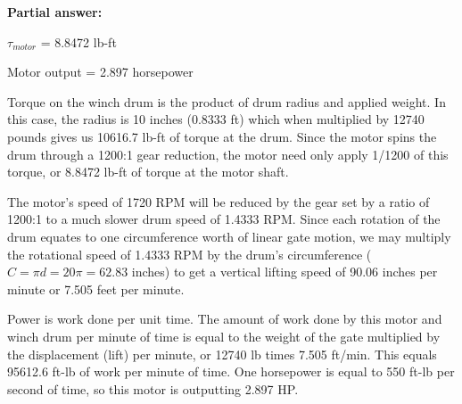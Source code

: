 





\noindent
{\bf Partial answer:}

\vskip 10pt

$\tau_{motor}$ = 8.8472 lb-ft

\vskip 10pt

Motor output = 2.897 horsepower







Torque on the winch drum is the product of drum radius and applied weight.  In this case, the radius is 10 inches (0.8333 ft) which when multiplied by 12740 pounds gives us 10616.7 lb-ft of torque at the drum.  Since the motor spins the drum through a 1200:1 gear reduction, the motor need only apply 1/1200 of this torque, or 8.8472 lb-ft of torque at the motor shaft.

\vskip 10pt

The motor's speed of 1720 RPM will be reduced by the gear set by a ratio of 1200:1 to a much slower drum speed of 1.4333 RPM.  Since each rotation of the drum equates to one circumference worth of linear gate motion, we may multiply the rotational speed of 1.4333 RPM by the drum's circumference ($C = \pi d = 20 \pi = 62.83$ inches) to get a vertical lifting speed of 90.06 inches per minute or 7.505 feet per minute.

\vskip 10pt

Power is work done per unit time.  The amount of work done by this motor and winch drum per minute of time is equal to the weight of the gate multiplied by the displacement (lift) per minute, or 12740 lb times 7.505 ft/min.  This equals 95612.6 ft-lb of work per minute of time.  One horsepower is equal to 550 ft-lb per second of time, so this motor is outputting 2.897 HP.



